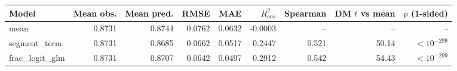 \begin{tabular}{lrrrrrrrr}
\toprule
Model & Mean obs. & Mean pred. & RMSE & MAE & $R^2_{oos}$ & Spearman & DM $t$ vs mean & $p$ (1-sided) \\
\midrule
mean & 0.8731 & 0.8744 & 0.0762 & 0.0632 & -0.0003 & -- & -- & -- \\
segment\_term & 0.8731 & 0.8685 & 0.0662 & 0.0517 & 0.2447 & 0.521 & 50.14 & $<10^{-299}$ \\
frac\_logit\_glm & 0.8731 & 0.8707 & 0.0642 & 0.0497 & 0.2912 & 0.542 & 54.43 & $<10^{-299}$ \\
\bottomrule
\end{tabular}
